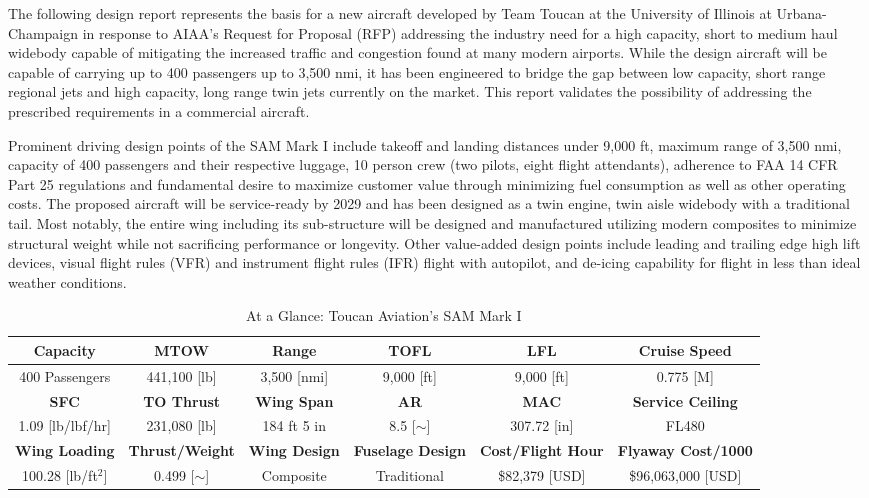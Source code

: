 \begin{singlespace}

The following design report represents the basis for a new aircraft developed by Team Toucan at the University of Illinois at Urbana-Champaign in response to AIAA's Request for Proposal \cite{RFP} (RFP) addressing the industry need for a high capacity, short to medium haul widebody capable of mitigating the increased traffic and congestion found at many modern airports.  While the design aircraft will be capable of carrying up to 400 passengers up to 3,500 nmi, it has been engineered to bridge the gap between low capacity, short range regional jets and high capacity, long range twin jets currently on the market.  This report validates the possibility of addressing the prescribed requirements in a commercial aircraft.

 Prominent driving design points of the SAM Mark I include takeoff and landing distances under 9,000 ft, maximum range of 3,500 nmi, capacity of 400 passengers and their respective luggage, 10 person crew (two pilots, eight flight attendants), adherence to FAA 14 CFR Part 25 regulations and fundamental desire to maximize customer value through minimizing fuel consumption as well as other operating costs.  The proposed aircraft will be service-ready by 2029 and has been designed as a twin engine, twin aisle widebody with a traditional tail.  Most notably, the entire wing including its sub-structure will be designed and manufactured utilizing modern composites to minimize structural weight while not sacrificing performance or longevity.  Other value-added design points include leading and trailing edge high lift devices, visual flight rules (VFR) and instrument flight rules (IFR) flight with autopilot, and de-icing capability for flight in less than ideal weather conditions.

\begin{table}[!h] 
    \centering
    \caption{At a Glance: Toucan Aviation's SAM Mark I}
    \begin{tabular}{ |c|c|c|c|c|c| }\toprule
    \textbf{Capacity} & \textbf{MTOW} & \textbf{Range} & \textbf{TOFL} & \textbf{LFL} & \textbf{Cruise Speed} \\\hline 
    400 Passengers & 441,100 [lb] & 3,500 [nmi] & 9,000 [ft] & 9,000 [ft] & 0.775 [M]  \\\hline \hline
    \textbf{SFC} & \textbf{TO Thrust} & \textbf{Wing Span} & \textbf{AR} & \textbf{MAC} & \textbf{Service Ceiling}  \\\hline 
    1.09 [lb/lbf/hr] & 231,080 [lb] & 184 ft 5 in & 8.5 [$\sim$] & 307.72 [in] & FL480  \\\hline \hline
    \textbf{Wing Loading} & \textbf{Thrust/Weight} & \textbf{Wing Design} & \textbf{Fuselage Design} & \textbf{Cost/Flight Hour} & \textbf{Flyaway Cost/1000}  \\\hline 
    100.28 [lb/ft$^2$] & 0.499 [$\sim$] & Composite & Traditional & \$82,379 [USD] & \$96,063,000 [USD] \\ \bottomrule


\end{tabular}
\end{table}
\end{singlespace}
